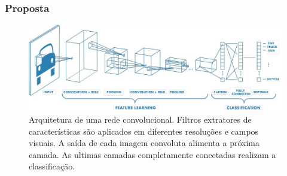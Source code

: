 \documentclass{beamer}
\begin{document}
\begin{frame}
    \frametitle{Proposta}
        \begin{figure}[!ht]
            \centering
            \includegraphics[width=0.95\columnwidth]{
                ../Imagens/CNN_mathworks.jpg
            }
            \caption{Arquitetura de uma rede convolucional. Filtros extratores de características são aplicados em diferentes resoluções e campos visuais. A saída de cada imagem convoluta alimenta a próxima camada. As ultimas camadas completamente conectadas realizam a classificação.}
            \label{fig:cnn}
        \end{figure}
    \end{frame}
\end{document}
